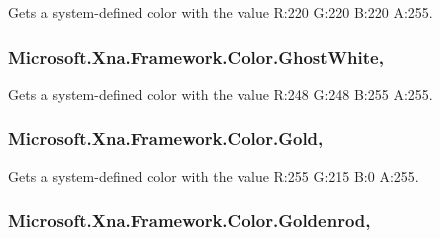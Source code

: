 Gets a system-\/defined color with the value R\+:220 G\+:220 B\+:220 A\+:255.

\hypertarget{struct_microsoft_1_1_xna_1_1_framework_1_1_color_aedf35bf29499b07657e3a5428f531200}{}
\subsubsection[{Ghost\+White}]{ Microsoft.\+Xna.\+Framework.\+Color.\+Ghost\+White\hspace{0.3cm}{\ttfamily [static]}, {\ttfamily [get]}}\label{struct_microsoft_1_1_xna_1_1_framework_1_1_color_aedf35bf29499b07657e3a5428f531200}


Gets a system-\/defined color with the value R\+:248 G\+:248 B\+:255 A\+:255.

\hypertarget{struct_microsoft_1_1_xna_1_1_framework_1_1_color_a37f1089253bfa0ea5832ff3d241b9b4b}{}
\subsubsection[{Gold}]{ Microsoft.\+Xna.\+Framework.\+Color.\+Gold\hspace{0.3cm}{\ttfamily [static]}, {\ttfamily [get]}}\label{struct_microsoft_1_1_xna_1_1_framework_1_1_color_a37f1089253bfa0ea5832ff3d241b9b4b}


Gets a system-\/defined color with the value R\+:255 G\+:215 B\+:0 A\+:255.

\hypertarget{struct_microsoft_1_1_xna_1_1_framework_1_1_color_a5d2e9b1b83269946e57ce840ebc2dd30}{}
\subsubsection[{Goldenrod}]{ Microsoft.\+Xna.\+Framework.\+Color.\+Goldenrod\hspace{0.3cm}{\ttfamily [static]}, {\ttfamily [get]}}\label{struct_microsoft_1_1_xna_1_1_framework_1_1_color_a5d2e9b1b83269946e57ce840ebc2dd30}



